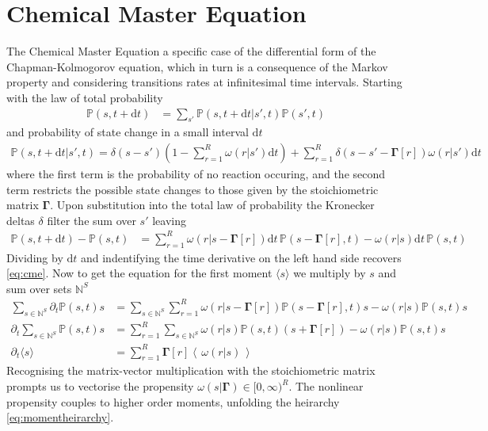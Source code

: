 \documentclass{article}[12pt]
\numberwithin{equation}{section}
\begin{document}
\section{Chemical Master Equation}\label{a:cme}
The Chemical Master Equation a specific case of the differential form of the
Chapman-Kolmogorov equation, which in turn is a consequence of the Markov property and
considering transitions rates at infinitesimal time intervals. Starting with
the law of total probability
\begin{align}
	\mathbb{P}(s,t+\mathrm{d}t) &=
	\sum_{s'} \mathbb{P}(s,t+\mathrm{d}t|s',t)\mathbb{P}(s',t)
\end{align}
and probability of state change in a small interval $\mathrm{d}t$
\begin{align}
	\mathbb{P}(s,t+\mathrm{d}t|s',t)=
		\delta(s-s')\left(1-\sum_{r=1}^R \omega(r|s')\mathrm{d}t\right)
		+\sum_{r=1}^R \delta(s-s'-\mathbf{\Gamma}[r])\omega(r|s')\mathrm{d}t
\end{align}
where the first term is the probability of no reaction occuring, and the
second term restricts the possible state changes to those given by
the stoichiometric matrix $\mathbf{\Gamma}$. Upon substitution into
the total law of probability the Kronecker deltas $\delta$ filter the sum
over $s'$ leaving
\begin{align*}
	\mathbb{P}(s,t+\mathrm{d}t)-\mathbb{P}(s,t) &=
	\sum_{r=1}^R  \omega(r|s-\mathbf{\Gamma}[r])\mathrm{d}t\,\mathbb{P}(s-\mathbf{\Gamma}[r],t)-
	\omega(r|s)\mathrm{d}t\,\mathbb{P}(s,t)
\end{align*}
Dividing by $\mathrm{d}t$ and indentifying the time derivative
on the left hand side recovers \eqref{eq:cme}. Now to get the
equation for the first moment $\langle s \rangle$ we multiply by
$s$ and sum over sets $\mathbb{N}^S$
\begin{align*}
	\sum_{s\in\mathbb{N}^S}\partial_t\mathbb{P}(s,t) s &=
	\sum_{s\in\mathbb{N}^S}\sum_{r=1}^R
	\omega(r|s-\mathbf{\Gamma}[r])\mathbb{P}(s-\mathbf{\Gamma}[r],t)s-\omega(r|s)\mathbb{P}(s,t)s\\
	\partial_t\sum_{s\in\mathbb{N}^S}\mathbb{P}(s,t) s &=
	\sum_{r=1}^R \sum_{s\in\mathbb{N}^S}
	\omega(r|s)\mathbb{P}(s,t)(s+\mathbf{\Gamma}[r])-\omega(r|s)\mathbb{P}(s,t)s\\
	\partial_t\langle s \rangle &=
	\sum_{r=1}^R
	\mathbf{\Gamma}[r]
 \left\langle\,
	\omega(r|s)
	\,\right\rangle
\end{align*}
Recognising the matrix-vector multiplication with the stoichiometric matrix
prompts us to vectorise the propensity $\omega(s|\mathbf{\Gamma})\in[0,\infty)^R$.
The nonlinear propensity couples to higher order moments, unfolding the
heirarchy \eqref{eq:momentheirarchy}.
\end{document}
